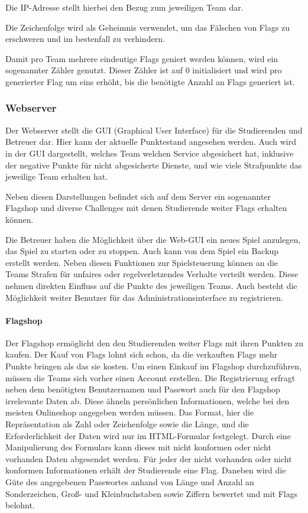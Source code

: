 Die IP-Adresse stellt hierbei den Bezug zum jeweiligen Team dar.

Die Zeichenfolge  wird als Geheimnis verwendet, um das Fälschen von Flags zu erschweren und im bestenfall zu verhindern.

Damit pro Team mehrere eindeutige Flags geniert werden können, wird ein sogenannter Zähler genutzt. Dieser Zähler ist auf 0 initialisiert und wird pro generierter Flag um eins erhöht, bis die benötigte Anzahl an Flags generiert ist.\cite[S.48]{sosnaKonzeptionUndRealisierung2010}

\subsubsection{Webserver}\label{subsubsec:Webserver}

Der Webserver stellt die GUI (Graphical User Interface) für die Studierenden und Betreuer dar. Hier kann der aktuelle Punktestand angesehen werden. Auch wird in der GUI dargestellt, welches Team welchen Service abgesichert hat, inklusive der negative Punkte für nicht abgesicherte Dienste, und wie viele Strafpunkte das jeweilige Team erhalten hat.

Neben diesen Darstellungen befindet sich auf dem Server ein sogenannter Flagshop und diverse Challenges mit denen Studierende weiter Flags erhalten können.

Die Betreuer haben die Möglichkeit über die Web-GUI ein neues Spiel anzulegen, das Spiel zu starten oder zu stoppen. Auch kann von dem Spiel ein Backup erstellt werden. Neben diesen Funktionen zur Spielsteuerung können an die Teams Strafen für unfaires oder regelverletzendes Verhalte verteilt werden. Diese nehmen direkten Einfluss auf die Punkte des jeweiligen Teams. Auch besteht die Möglichkeit weiter Benutzer für das Administrationsinterface zu registrieren.

\paragraph{Flagshop} \label{para:Flagshop}
Der Flagshop ermöglicht den den Studierenden weiter Flags mit ihren Punkten zu kaufen. Der Kauf von Flags lohnt sich schon, da die verkauften Flags mehr Punkte bringen als das sie kosten. Um einen Einkauf im Flagshop durchzuführen, müssen die Teams sich vorher einen Account erstellen. Die Registrierung erfragt neben dem benötigten Benutzernamen und Passwort auch für den Flagshop irrelevante Daten ab. Diese ähneln persönlichen Informationen, welche bei den meisten Onlineshop angegeben werden müssen. Das Format, hier die Repräsentation als Zahl oder Zeichenfolge sowie die Länge, und die Erforderlichkeit der Daten wird nur im HTML-Formular festgelegt. Durch eine Manipulierung des Formulars kann dieses mit nicht konformen oder nicht vorhanden Daten abgesendet werden. Für jeder der nicht vorhanden oder nicht konformen Informationen erhält der Studierende eine Flag. Daneben wird die Güte des angegebenen Passwortes anhand von Länge und Anzahl an Sonderzeichen, Groß- und Kleinbuchstaben sowie Ziffern bewertet und mit Flags belohnt.

